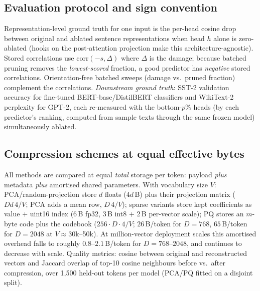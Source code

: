 \documentclass[conference]{IEEEtran}
\begin{document}
\subsection{Evaluation protocol and sign convention}
Representation-level ground truth for one input is the per-head cosine
drop between original and ablated sentence representations when head $h$
alone is zero-ablated (hooks on the post-attention projection make this
architecture-agnostic). Stored correlations use
$\mathrm{corr}(-s,\Delta)$ where $\Delta$ is the damage; because batched
pruning removes the \emph{lowest-scored} fraction, a good predictor has
\emph{negative} stored correlations. Orientation-free batched sweeps
(damage vs.\ pruned fraction) complement the correlations.
\emph{Downstream ground truth}: SST-2 validation accuracy for
fine-tuned BERT-base/DistilBERT classifiers and WikiText-2 perplexity
for GPT-2, each re-measured with the bottom-$p\%$ heads (by each
predictor's ranking, computed from sample texts through the same frozen
model) simultaneously ablated.

\subsection{Compression schemes at equal effective bytes}
All methods are compared at equal \emph{total} storage per token:
payload \emph{plus} metadata \emph{plus} amortised shared parameters.
With vocabulary size $V$: PCA/random-projection store $d$ floats
($4d$\,B) plus their projection matrix ($D d\,4/V$; PCA adds a mean row,
$D\,4/V$); sparse variants store kept coefficients as value $+$ uint16
index ($6$\,B fp32, $3$\,B int8 $+$ 2\,B per-vector scale); PQ stores an
$m$-byte code plus the codebook ($256\cdot D\cdot4/V$; $26$\,B/token for
$D{=}768$, $65$\,B/token for $D{=}2048$ at $V{\approx}30$k--50k).
At million-vector deployment scales this amortised overhead falls to
roughly $0.8$--$2.1$\,B/token for $D{=}768$--$2048$, and continues to
decrease with scale.
Quality metrics: cosine between original and reconstructed vectors and
Jaccard overlap of top-10 cosine neighbours before vs.\ after
compression, over 1{,}500 held-out tokens per model (PCA/PQ fitted on a
disjoint split).
\end{document}
